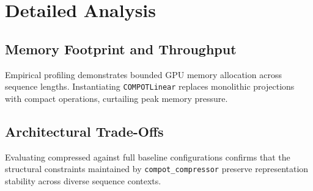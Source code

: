 \section{Detailed Analysis}

\subsection{Memory Footprint and Throughput}
Empirical profiling demonstrates bounded GPU memory allocation across sequence lengths. Instantiating \texttt{COMPOTLinear} replaces monolithic projections with compact operations, curtailing peak memory pressure.

\subsection{Architectural Trade-Offs}
Evaluating compressed against full baseline configurations confirms that the structural constraints maintained by \texttt{compot_compressor} preserve representation stability across diverse sequence contexts.
